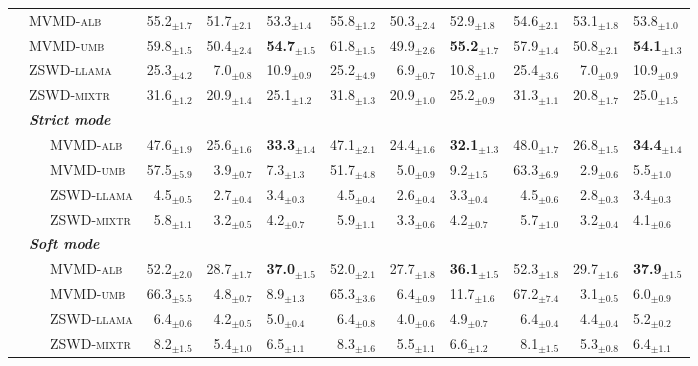 \begin{table*}[!ht]
{\begin{tabular}{clrra|rra|rra}
    \midrule
     &
    \textsc{MVMD-alb} & 55.2$_{\pm1.7}$ & 51.7$_{\pm2.1}$ & 53.3$_{\pm1.4}$ & 55.8$_{\pm1.2}$ & 50.3$_{\pm2.4}$ & 52.9$_{\pm1.8}$ & 54.6$_{\pm2.1}$ & 53.1$_{\pm1.8}$ & 53.8$_{\pm1.0}$ \\
    & \textsc{MVMD-umb} & 59.8$_{\pm1.5}$ & 50.4$_{\pm2.4}$ & \textbf{54.7}$_{\pm1.5}$ & 61.8$_{\pm1.5}$ & 49.9$_{\pm2.6}$ & \textbf{55.2}$_{\pm1.7}$ & 57.9$_{\pm1.4}$ & 50.8$_{\pm2.1}$ & \textbf{54.1}$_{\pm1.3}$ \\
    & \textsc{ZSWD-llama} & 25.3$_{\pm4.2}$ & 7.0$_{\pm0.8}$ & 10.9$_{\pm0.9}$ & 25.2$_{\pm4.9}$ & 6.9$_{\pm0.7}$ & 10.8$_{\pm1.0}$ & 25.4$_{\pm3.6}$ & 7.0$_{\pm0.9}$ & 10.9$_{\pm0.9}$ \\
    & \textsc{ZSWD-mixtr} & 31.6$_{\pm1.2}$ & 20.9$_{\pm1.4}$ & 25.1$_{\pm1.2}$ & 31.8$_{\pm1.3}$ & 20.9$_{\pm1.0}$ & 25.2$_{\pm0.9}$ & 31.3$_{\pm1.1}$ & 20.8$_{\pm1.7}$ & 25.0$_{\pm1.5}$ \\
    \midrule
     &
    \textbf{\emph{Strict mode}} &  &  &  &  &  & \\
    & ~~~\textsc{MVMD-alb} & 47.6$_{\pm1.9}$ & 25.6$_{\pm1.6}$ & \textbf{33.3}$_{\pm1.4}$ & 47.1$_{\pm2.1}$ & 24.4$_{\pm1.6}$ & \textbf{32.1}$_{\pm1.3}$ & 48.0$_{\pm1.7}$ & 26.8$_{\pm1.5}$ & \textbf{34.4}$_{\pm1.4}$ \\
    & ~~~\textsc{MVMD-umb} & 57.5$_{\pm5.9}$ & 3.9$_{\pm0.7}$ & 7.3$_{\pm1.3}$ & 51.7$_{\pm4.8}$ & 5.0$_{\pm0.9}$ & 9.2$_{\pm1.5}$ & 63.3$_{\pm6.9}$ & 2.9$_{\pm0.6}$ & 5.5$_{\pm1.0}$ \\
    & ~~~\textsc{ZSWD-llama} & 4.5$_{\pm0.5}$ & 2.7$_{\pm0.4}$ & 3.4$_{\pm0.3}$ & 4.5$_{\pm0.4}$ & 2.6$_{\pm0.4}$ & 3.3$_{\pm0.4}$ & 4.5$_{\pm0.6}$ & 2.8$_{\pm0.3}$ & 3.4$_{\pm0.3}$ \\
    & ~~~\textsc{ZSWD-mixtr} & 5.8$_{\pm1.1}$ & 3.2$_{\pm0.5}$ & 4.2$_{\pm0.7}$ & 5.9$_{\pm1.1}$ & 3.3$_{\pm0.6}$ & 4.2$_{\pm0.7}$ & 5.7$_{\pm1.0}$ & 3.2$_{\pm0.4}$ & 4.1$_{\pm0.6}$ \\
    & \textbf{\emph{Soft mode}} &  &  &  &  &  & \\
    & ~~~\textsc{MVMD-alb} & 52.2$_{\pm2.0}$ & 28.7$_{\pm1.7}$ & \textbf{37.0}$_{\pm1.5}$ & 52.0$_{\pm2.1}$ & 27.7$_{\pm1.8}$ & \textbf{36.1}$_{\pm1.5}$ & 52.3$_{\pm1.8}$ & 29.7$_{\pm1.6}$ & \textbf{37.9}$_{\pm1.5}$ \\
    & ~~~\textsc{MVMD-umb} & 66.3$_{\pm5.5}$ & 4.8$_{\pm0.7}$ & 8.9$_{\pm1.3}$ & 65.3$_{\pm3.6}$ & 6.4$_{\pm0.9}$ & 11.7$_{\pm1.6}$ & 67.2$_{\pm7.4}$ & 3.1$_{\pm0.5}$ & 6.0$_{\pm0.9}$ \\
    & ~~~\textsc{ZSWD-llama} & 6.4$_{\pm0.6}$ & 4.2$_{\pm0.5}$ & 5.0$_{\pm0.4}$ & 6.4$_{\pm0.8}$ & 4.0$_{\pm0.6}$ & 4.9$_{\pm0.7}$ & 6.4$_{\pm0.4}$ & 4.4$_{\pm0.4}$ & 5.2$_{\pm0.2}$ \\
    & ~~~\textsc{ZSWD-mixtr} & 8.2$_{\pm1.5}$ & 5.4$_{\pm1.0}$ & 6.5$_{\pm1.1}$ & 8.3$_{\pm1.6}$ & 5.5$_{\pm1.1}$ & 6.6$_{\pm1.2}$ & 8.1$_{\pm1.5}$ & 5.3$_{\pm0.8}$ & 6.4$_{\pm1.1}$ \\
    \bottomrule
    

\end{tabular}}
\end{table*}
